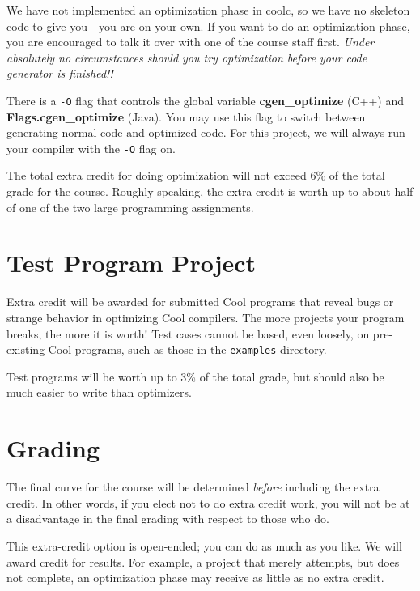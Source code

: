 \documentclass[11pt]{article}
\def\U#1{{\sf{}#1}}
\def\C#1{{\bf{}#1}}
\begin{document}
We have not implemented an optimization phase in \U{coolc}, so we have
no skeleton code to give you---you are on your own.  If you want to do
an optimization phase, you are encouraged to talk it over with one of
the course staff first. {\em Under absolutely no circumstances should
you try optimization before your code generator is finished!!}

There is a {\tt -O} flag that controls the global variable
\C{cgen\_optimize} (C++) and \C{Flags.cgen\_optimize} (Java).  You may
use this flag to switch between generating normal code and optimized
code.  For this project, we will always run your compiler with the
{\tt -O} flag on.

The total extra credit for doing optimization will not exceed 6\% of
the total grade for the course.  Roughly speaking, the extra credit is
worth up to about half of one of the two large programming
assignments.

\section{Test Program Project}

Extra credit will be awarded for submitted Cool programs that reveal
bugs or strange behavior in optimizing Cool compilers.  The more
projects your program breaks, the more it is worth!  Test cases cannot
be based, even loosely, on pre-existing Cool programs, such as those
in the {\tt examples} directory.

Test programs will be worth up to 3\% of the total grade, but should
also be much easier to write than optimizers.

\section{Grading}

The final curve for the course will be determined {\em before}
including the extra credit.  In other words, if you elect not to do
extra credit work, you will not be at a disadvantage in the final
grading with respect to those who do.

This extra-credit option is open-ended; you can do as much as you
like.  We will award credit for results. For example, a project that
merely attempts, but does not complete, an optimization phase may
receive as little as no extra credit.
\end{document}
